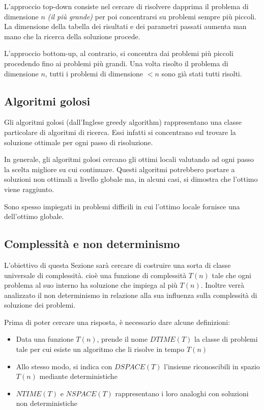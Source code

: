 \documentclass[italian, 10pt]{article}
\begin{document}
L'approccio top-down consiste nel cercare di risolvere dapprima il problema di dimensione \(n\) \textit{(il più grande)} per poi concentrarsi su problemi sempre più piccoli.
La dimensione della tabella dei risultati e dei parametri passati aumenta man mano che la ricerca della soluzione procede.

L'approccio bottom-up, al contrario, si concentra dai problemi più piccoli procedendo fino ai problemi più grandi.
Una volta risolto il problema di dimensione \(n\), tutti i problemi di dimensione \(< n\) sono già stati tutti risolti.

\subsection{Algoritmi golosi}

Gli algoritmi golosi (dall'Inglese greedy algorithm) rappresentano una classe particolare di algoritmi di ricerca.
Essi infatti si concentrano sul trovare la soluzione ottimale per ogni passo di risoluzione.

In generale, gli algoritmi golosi cercano gli ottimi locali valutando ad ogni passo la scelta migliore su cui continuare.
Questi algoritmi potrebbero portare a soluzioni non ottimali a livello globale ma, in alcuni casi, si dimostra che l'ottimo viene raggiunto.

Sono spesso impiegati in problemi difficili in cui l'ottimo locale fornisce una  dell'ottimo globale.

\subsection{Complessità e non determinismo}

L'obiettivo di questa Sezione sarà cercare di costruire una sorta di classe universale di complessità. cioè una funzione di complessità \(T(n)\) tale che ogni problema al suo interno ha soluzione che impiega al più \(T(n)\).
Inoltre verrà analizzato il non determinismo in relazione alla sua influenza sulla complessità di soluzione dei problemi.

Prima di poter cercare una risposta, è necessario dare alcune definizioni:

\begin{itemize}
  \item Data una funzione \(T(n)\), prende il nome \textbf{\(DTIME(T)\)} la classe di problemi tale per cui esiste un algoritmo che li risolve in tempo \(T(n)\)
  \item Allo stesso modo, si indica con \textbf{\(DSPACE(T)\)} l'insieme riconoscibili in spazio \(T(n)\) mediante \TM deterministiche
  \item \(NTIME(T)\) e \(NSPACE(T)\) rappresentano i loro analoghi con soluzioni non deterministiche
\end{itemize}
\end{document}
